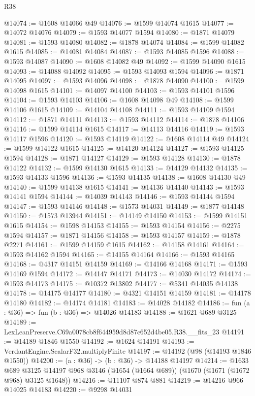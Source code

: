 \begin{lexlean}{R38}
\begin{coremodule}
@14074 := @1608 @14066 @49
@14076 := @1599 @14074 @1615
@14077 := @14072 @14076
@14079 := @1593 @14077 @1594
@14080 := @1871 @14079
@14081 := @1593 @14080
@14082 := @1878 @14074
@14084 := @1599 @14082 @1615
@14085 := @14081 @14084
@14087 := @1593 @14085 @1596
@14088 := @1593 @14087
@14090 := @1608 @14082 @49
@14092 := @1599 @14090 @1615
@14093 := @14088 @14092
@14095 := @1593 @14093 @1594
@14096 := @1871 @14095
@14097 := @1593 @14096
@14098 := @1878 @14090
@14100 := @1599 @14098 @1615
@14101 := @14097 @14100
@14103 := @1593 @14101 @1596
@14104 := @1593 @14103
@14106 := @1608 @14098 @49
@14108 := @1599 @14106 @1615
@14109 := @14104 @14108
@14111 := @1593 @14109 @1594
@14112 := @1871 @14111
@14113 := @1593 @14112
@14114 := @1878 @14106
@14116 := @1599 @14114 @1615
@14117 := @14113 @14116
@14119 := @1593 @14117 @1596
@14120 := @1593 @14119
@14122 := @1608 @14114 @49
@14124 := @1599 @14122 @1615
@14125 := @14120 @14124
@14127 := @1593 @14125 @1594
@14128 := @1871 @14127
@14129 := @1593 @14128
@14130 := @1878 @14122
@14132 := @1599 @14130 @1615
@14133 := @14129 @14132
@14135 := @1593 @14133 @1596
@14136 := @1593 @14135
@14138 := @1608 @14130 @49
@14140 := @1599 @14138 @1615
@14141 := @14136 @14140
@14143 := @1593 @14141 @1594
@14144 := @14039 @14143
@14146 := @1593 @14144 @1594
@14147 := @1593 @14146
@14148 := @1573 @14031
@14149 := @1877 @14148
@14150 := @1573 @13944
@14151 := @14149 @14150
@14153 := @1599 @14151 @1615
@14154 := @1598 @14153
@14155 := @1593 @14154
@14156 := @2275 @1594
@14157 := @1871 @14156
@14158 := @1593 @14157
@14159 := @1878 @2271
@14161 := @1599 @14159 @1615
@14162 := @14158 @14161
@14164 := @1593 @14162 @1594
@14165 := @14155 @14164
@14166 := @1593 @14165
@14168 := @4317 @14151 @14159
@14169 := @14166 @14168
@14171 := @1593 @14169 @1594
@14172 := @14147 @14171
@14173 := @14030 @14172
@14174 := @1593 @14173
@14175 := @10372 @13802
@14177 := @5341 @14035 @14138
@14178 := @14175 @14177
@14180 := @4321 @14151 @14159
@14181 := @14178 @14180
@14182 := @14174 @14181
@14183 := @14028 @14182
@14186 := fun (a : @36) => fun (b : @36) => @14026 @14183
@14188 := @1621 @689 @3125
@14189 := LexLeanPreserve.C69a0078cb8f644959d8d87c652d4be05.R38.__fits_23
@14191 := @14189 @1846 @1550
@14192 := @1624 @14191
@14193 := VerdantEngine.ScalarF32.multiplyFinite
@14197 := @14192 (@98 (@14193 @1846 @1550))
@14200 := (a : @36) -> (b : @36) -> @14188 @14197
@14214 := @1633
    @689
    @3125
    @14197
    @968
    @3146
    (@1654 (@1664 @689))
    (@1670 (@1671 (@1672 @968) @3125 @1648))
@14216 := @11107 @874 @881
@14219 := @14216 @966 @14025 @14183
@14220 := @9298 @14031

\end{coremodule}
\end{lexlean}
